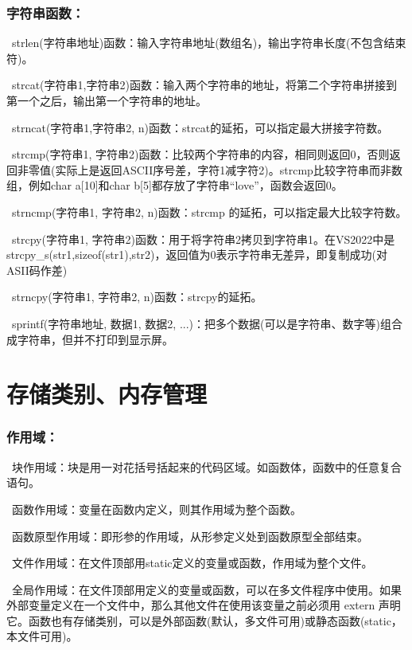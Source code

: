 \documentclass[zihao=-4,UTF8]{report}
\begin{document}
\subsubsection{字符串函数：}
\ strlen(字符串地址)函数：输入字符串地址(数组名)，输出字符串长度(不包含结束符)。\par
{}\ strcat(字符串1,字符串2)函数：输入两个字符串的地址，将第二个字符串拼接到第一个之后，输出第一个字符串的地址。\par
{}\ strncat(字符串1,字符串2, n)函数：strcat的延拓，可以指定最大拼接字符数。\par
{}\ strcmp(字符串1, 字符串2)函数：比较两个字符串的内容，相同则返回0，否则返回非零值(实际上是返回ASCII序号差，字符1减字符2)。{\color{gray}\small strcmp比较字符串而非数组，例如char a[10]和char b[5]都存放了字符串``love''，函数会返回0。}\par
{}\ strncmp(字符串1, 字符串2, n)函数：strcmp 的延拓，可以指定最大比较字符数。\par
{}\ strcpy(字符串1, 字符串2)函数：用于将字符串2拷贝到字符串1。{\color{gray}\small 在VS2022中是strcpy\_s(str1,sizeof(str1),str2)，返回值为0表示字符串无差异，即复制成功(对ASII码作差)}\par
{}\ strncpy(字符串1, 字符串2, n)函数：strcpy的延拓。\par
{}\ sprintf(字符串地址, 数据1, 数据2, ...)：把多个数据(可以是字符串、数字等)组合成字符串，但并不打印到显示屏。

\section{存储类别、内存管理}
\subsubsection{作用域：}
\ 块作用域：块是用一对花括号括起来的代码区域。{\color{gray}\small 如函数体，函数中的任意复合语句。}\par
{}\ 函数作用域：变量在函数内定义，则其作用域为整个函数。\par
{}\ 函数原型作用域：即形参的作用域，从形参定义处到函数原型全部结束。\par
{}\ 文件作用域：在文件顶部用static定义的变量或函数，作用域为整个文件。\par
{}\ 全局作用域：在文件顶部用定义的变量或函数，可以在多文件程序中使用。{\color{gray}\small 如果外部变量定义在一个文件中，那么其他文件在使用该变量之前必须用 extern 声明它。函数也有存储类别，可以是外部函数(默认，多文件可用)或静态函数(static，本文件可用)。}
\end{document}
